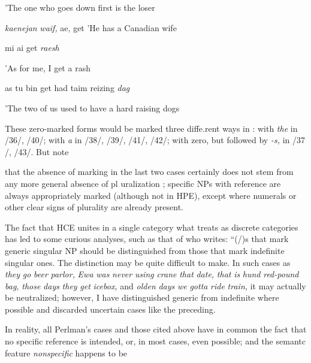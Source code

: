 'The one who goes down first is the loser

\ea\label{ex:41}
 \textit{kaenejan} \textit{waif,} ae, get 'He has a Canadian wife
\glt
\z

\ea\label{ex:42}
 mi ai get \textit{raesh}
\glt
\z

'As for me, I get a rash

\ea\label{ex:43}
 as tu bin get had taim reizing \textit{dag}
\glt
\z

'The two of us used to have a hard  raising dogs

These zero-marked forms would be marked three diffe.rent ways in : with \textit{the }in /36/, /40/; with \textit{a} in /38/, /39/, /41/, /42/; with zero, but followed by  \textit{{}-s, }in /37 /, /43/. But note

that the absence of  marking in the last two cases certainly does not stem from any more general absence of pl uralization ; specific NPs with  reference are always appropriately marked  (although not in HPE), except where numerals or other clear signs of plurality are already present.

The fact that HCE unites in a single category what  treats as discrete categories has led to some curious analyses, such as that of \citet[99]{Perlman1973} who writes: ``(/)s that mark generic singular NP should be distinguished from those that mark indefinite singular ones. The distinction may be quite difficult to make. In such cases as \textit{they} \textit{go} \textit{beer} \textit{parlor,} \textit{Ewa} \textit{was} \textit{never} \textit{using} \textit{crane} \textit{that} \textit{date,} \textit{that} \textit{is} \textit{hund} \textit{red-pound} \textit{bag,} \textit{those }\textit{d}\textit{ays} \textit{they} \textit{get} \textit{icebox,} and \textit{olden} \textit{days} \textit{we} \textit{gotta} \textit{ride} \textit{train,} it may actually be neutralized; however, I have dis\-tinguished generic from indefinite where possible and discarded un\-certain cases like the preceding.{\textquotedbl}

In reality, all Perlman's cases and those cited above have in common the fact that no specific reference is intended, or, in most cases, even possible; and the semantc feature \textit{nonspecific} happens to be


